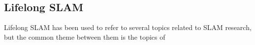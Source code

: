 \subsection{Lifelong SLAM}

Lifelong SLAM has been used to refer to several topics related to SLAM research, but the common theme between them is the topics of